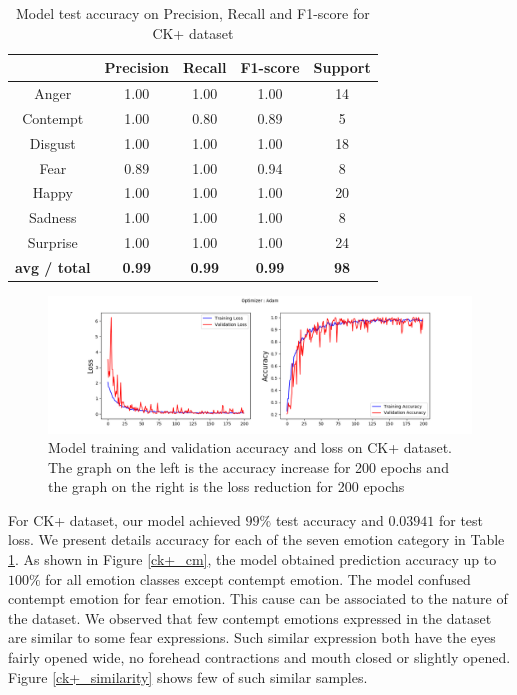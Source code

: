 \documentclass[master]{thesis-uestc}
\begin{document}
\begin{table}[ht]
\renewcommand{\arraystretch}{1.3}
\caption{Model test accuracy on Precision, Recall and F1-score for CK+ dataset}
\label{table_ck+_scores}
\begin{center}
\begin{tabular}{|c|c|c|c|c|}

\hline
 & Precision & Recall & F1-score & Support\\ \hline

Anger & 1.00 & 1.00 & 1.00 & 14\\ \hline
Contempt & 1.00 & 0.80 & 0.89 & 5\\ \hline
Disgust & 1.00 & 1.00 & 1.00 & 18\\ \hline
Fear & 0.89 & 1.00 & 0.94 & 8\\ \hline
Happy & 1.00 & 1.00 & 1.00 & 20\\ \hline
Sadness & 1.00 & 1.00 & 1.00 & 8\\ \hline
Surprise & 1.00 & 1.00 & 1.00 & 24\\ \hline

\textbf{avg / total} & \textbf{0.99} & \textbf{0.99} & \textbf{0.99} & \textbf{98}\\ \hline
\end{tabular}
\end{center}
\end{table}

\begin{figure}[ht]
\includegraphics[width=5in]{pic/XK+_accuracy_and_loss.png}
\caption{Model training and validation accuracy and loss on CK+ dataset. The graph on the left is the accuracy increase for 200 epochs and the graph on the right is the loss reduction for 200 epochs}
\label{ck+accuracy_loss}
\end{figure}

For CK+ dataset, our model achieved $99\%$ test accuracy and $0.03941$ for test loss. We present details accuracy for each of the seven emotion category in Table \ref{table_ck+_scores}. As shown in Figure \ref{ck+_cm}, the model obtained prediction accuracy up to $100\%$ for all emotion classes except contempt emotion. The model confused contempt emotion for fear emotion. This cause can be associated to the nature of the dataset. We observed that few contempt emotions expressed in the dataset are similar to some fear expressions. Such similar expression both have the eyes fairly opened wide, no forehead contractions and mouth closed or slightly opened. Figure \ref{ck+_similarity} shows few of such similar samples.
\end{document}
